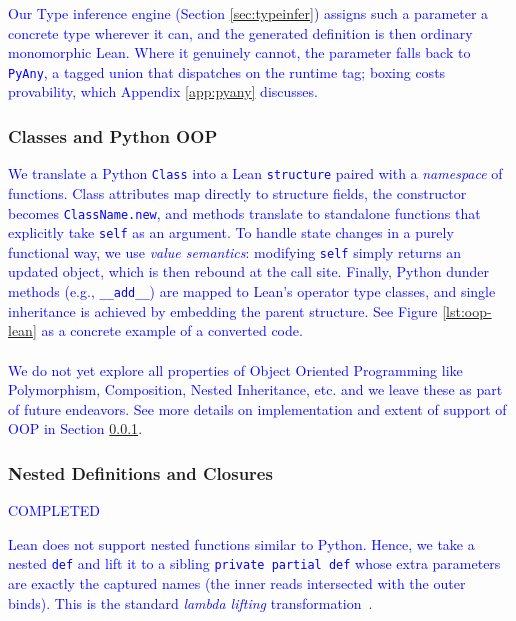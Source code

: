 \documentclass{article}
\newcommand{\code}{\lstinline}
\newcommand{\suggest}[1]{\textcolor{blue}{#1}}
\begin{document}
\suggest{Our Type inference engine (Section \ref{sec:typeinfer}) assigns such a parameter a concrete type wherever it can, and the generated definition is then ordinary monomorphic Lean. Where it genuinely cannot, the parameter falls back to \code{PyAny}, a tagged union that dispatches on the runtime tag; boxing costs provability, which Appendix \ref{app:pyany} discusses.}

\subsubsection{Classes and Python OOP} \label{sec:oop}

\suggest{ We translate a Python \code{Class} into a Lean \code{structure} paired with a \emph{namespace} of functions. Class attributes map directly to structure fields, the constructor becomes \code{ClassName.new}, and methods translate to standalone functions that explicitly take \code{self} as an argument. To handle state changes in a purely functional way, we use \emph{value semantics}: modifying \code{self} simply returns an updated object, which is then rebound at the call site. Finally, Python dunder methods (e.g., \code{__add__}) are mapped to Lean's operator type classes, and single inheritance is achieved by embedding the parent structure. See Figure \ref{lst:oop-lean} as a concrete example of a converted code. \\\\ We do not yet explore all properties of Object Oriented Programming like Polymorphism, Composition, Nested Inheritance, etc. and we leave these as part of future endeavors. See more details on implementation and extent of support of OOP in Section \ref{sec:oop}.
}

\subsubsection{Nested Definitions and Closures}
\suggest{COMPLETED}


\suggest{Lean does not support nested functions similar to Python. Hence, we take a nested \code{def} and lift it to a sibling \code{private partial def} whose extra parameters are exactly the captured names (the inner reads intersected with the outer binds). This is the standard \emph{lambda lifting} transformation~\cite{johnsson1985lambdalifting}. }
\end{document}

